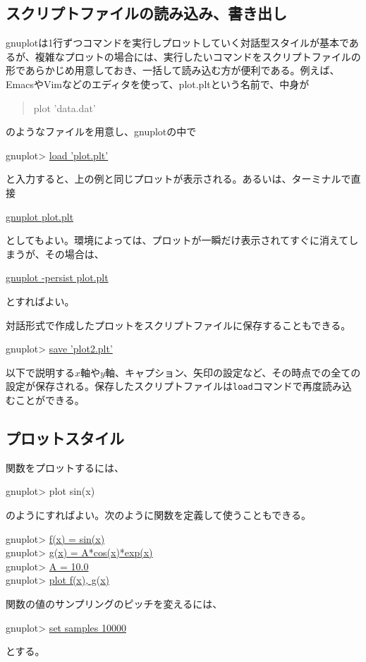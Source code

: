 \subsection{スクリプトファイルの読み込み、書き出し}

gnuplotは1行ずつコマンドを実行しプロットしていく対話型スタイルが基本であるが、複雑なプロットの場合には、実行したいコマンドをスクリプトファイルの形であらかじめ用意しておき、一括して読み込む方が便利である。例えば、EmacsやVimなどのエディタを使って、plot.pltという名前で、中身が
\begin{quote}
    plot 'data.dat'
\end{quote}
のようなファイルを用意し、gnuplotの中で
\begin{commandline2}
    gnuplot> \underline{load 'plot.plt'}
\end{commandline2} \noindent
と入力すると、上の例と同じプロットが表示される。あるいは、ターミナルで直接
\begin{commandline2}
    \prompt \underline{gnuplot plot.plt}
\end{commandline2} \noindent
としてもよい。環境によっては、プロットが一瞬だけ表示されてすぐに消えてしまうが、その場合は、
\begin{commandline2}
    \prompt \underline{gnuplot -persist plot.plt}
\end{commandline2} \noindent
とすればよい。

対話形式で作成したプロットをスクリプトファイルに保存することもできる。
\begin{commandline2}
    gnuplot> \underline{save 'plot2.plt'}
\end{commandline2} \noindent
以下で説明する\(x\)軸や\(y\)軸、キャプション、矢印の設定など、その時点での全ての設定が保存される。保存したスクリプトファイルは\texttt{load}コマンドで再度読み込むことができる。

\subsection{プロットスタイル}
関数をプロットするには、
\begin{commandline2}
    gnuplot> plot sin(x)
\end{commandline2} \noindent
のようにすればよい。次のように関数を定義して使うこともできる。
\begin{commandline2}
    gnuplot> \underline{f(x) = sin(x)} \\
    gnuplot> \underline{g(x) = A*cos(x)*exp(x)} \\
    gnuplot> \underline{A = 10.0} \\
    gnuplot> \underline{plot f(x), g(x)}
\end{commandline2} \noindent
関数の値のサンプリングのピッチを変えるには、
\begin{commandline2}
    gnuplot> \underline{set samples 10000}
\end{commandline2} \noindent
とする。

